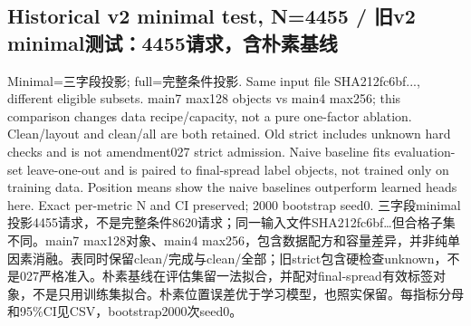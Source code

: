 \documentclass[10pt,a4paper,fontset=fandol]{ctexart}
\begin{document}
\subsection{Historical v2 minimal test, N=4455 / 旧v2 minimal测试：4455请求，含朴素基线}
Minimal=三字段投影; full=完整条件投影. Same input file SHA212fc6bf..., different eligible subsets. main7 max128 objects vs main4 max256; this comparison changes data recipe/\allowbreak{}capacity, not a pure one-\allowbreak{}factor ablation. Clean/\allowbreak{}layout and clean/\allowbreak{}all are both retained. Old strict includes unknown hard checks and is not amendment027 strict admission. Naive baseline fits evaluation-\allowbreak{}set leave-\allowbreak{}one-\allowbreak{}out and is paired to final-\allowbreak{}spread label objects, not trained only on training data. Position means show the naive baselines outperform learned heads here. Exact per-\allowbreak{}metric N and CI preserved; 2000 bootstrap seed0.
三字段minimal投影4455请求，不是完整条件8620请求；同一输入文件SHA212fc6bf…但合格子集不同。main7 max128对象、main4 max256，包含数据配方和容量差异，并非纯单因素消融。表同时保留clean/\allowbreak{}完成与clean/\allowbreak{}全部；旧strict包含硬检查unknown，不是027严格准入。朴素基线在评估集留一法拟合，并配对final-\allowbreak{}spread有效标签对象，不是只用训练集拟合。朴素位置误差优于学习模型，也照实保留。每指标分母和95\%CI见CSV，bootstrap2000次seed0。
\begingroup\small
\end{document}
